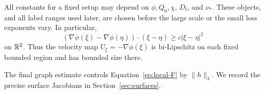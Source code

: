 All constants for a fixed setup may depend on \(\phi,Q_0,\chi\),
\(D_{\mathrm f}\), and \(\nu_*\). These objects, and all label ranges
used later, are chosen before the large scale or the small loss
exponents vary. In particular,
\begin{equation}\label{eq:velocity-monotonicity}
 (\nabla\phi(\xi)-\nabla\phi(\eta))\cdot(\xi-\eta)
 \ge c|\xi-\eta|^2
\end{equation}
on \(\mathbb R^2\). Thus the velocity map \(U_\xi=-\nabla\phi(\xi)\) is
bi-Lipschitz on each fixed bounded region and has bounded size there.

The final graph estimate controls Equation~\eqref{eq:local-F} by
\(\|h\|_3\). We record the precise surface Jacobians in
Section~\ref{sec:surfaces}.
